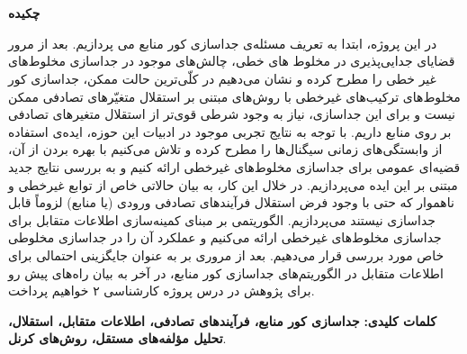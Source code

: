 \chapter*{}
\begin{center}
\vspace{0.9cm}
\large
\textbf{چکیده}
\end{center}
در  این پروژه، ابتدا به تعریف مسئله‌ی جداسازی کور منابع می پردازیم. بعد از مرور قضایای جدایی‌پذیری در مخلوط های خطی، چالش‌های موجود در جداسازی مخلوط‌های غیر خطی را مطرح کرده و نشان می‌دهیم در کلّی‌ترین حالت ممکن، جداسازی کور مخلوط‌های ترکیب‌های غیرخطی با روش‌های مبتنی بر استقلال متغیّر‌های تصادفی ممکن نیست و برای این جداسازی، نیاز به وجود شرطی قوی‌تر از استقلال متغیر‌های تصادفی بر روی منابع داریم. با توجه به نتایج تجربی موجود در ادبیات این حوزه، ایده‌ی استفاده از وابستگی‌های زمانی‌ سیگنال‌ها را مطرح کرده و تلاش می‌کنیم با بهره بردن از آن، قضیه‌ای عمومی برای جداسازی مخلوط‌های غیرخطی ارائه کنیم و  به بررسی نتایج جدید مبتنی بر این ایده می‌پردازیم. در خلال این کار، به بیان حالاتی خاص از توابع غیرخطی و ناهموار که حتی با وجود فرض استقلال فرآیند‌های تصادفی ورودی (یا منابع) لزوماً قابل جداسازی نیستند می‌پردازیم.  الگوریتمی بر مبنای کمینه‌سازی اطلاعات متقابل برای جداسازی مخلوط‌های غیرخطی ارائه می‌کنیم و عملکرد آن را در جداسازی مخلوطی خاص مورد بررسی قرار می‌دهیم. بعد از مروری بر 
به عنوان جایگزینی احتمالی برای اطلاعات متقابل در الگوریتم‌های جداسازی کور منابع، در آخر  به بیان راه‌‌های پیش رو برای پژوهش در درس پروژه کارشناسی ۲ خواهیم پرداخت.




\vspace{0.3cm}
\noindent\textbf{کلمات کلیدی:}\noindent
\textbf
{جداسازی کور منابع، فرآیند‌های تصادفی، اطلاعات متقابل، استقلال، تحلیل مؤلفه‌های مستقل، روش‌های کرنل}.
